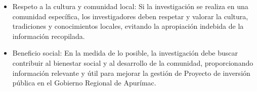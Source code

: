 \begin{itemize}
	\item Respeto a la cultura y comunidad local: Si la investigación se realiza en una comunidad específica, los investigadores deben respetar y valorar la cultura, tradiciones y conocimientos locales, evitando la apropiación indebida de la información recopilada.

	\item Beneficio social: En la medida de lo posible, la investigación debe buscar contribuir al bienestar social y al desarrollo de la comunidad, proporcionando información relevante y útil para mejorar la gestión de Proyecto de inversión pública en el Gobierno Regional de Apurímac.

\end{itemize}
